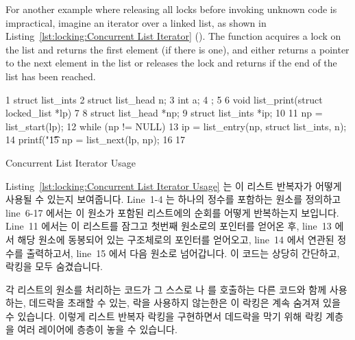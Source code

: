 For another example where releasing all locks before invoking unknown
code is impractical, imagine an iterator over a linked list, as shown in
Listing~\ref{lst:locking:Concurrent List Iterator} ().
The  function acquires a lock on the list and returns
the first element (if there is one), and
 either returns a pointer to the next element in the list
or releases the lock and returns  if the end of the list has
been reached.
\fi

\begin{listing}[tbp]
{ \scriptsize
\begin{verbbox}
  1 struct list_ints {
  2   struct list_head n;
  3   int a;
  4 };
  5 
  6 void list_print(struct locked_list *lp)
  7 {
  8   struct list_head *np;
  9   struct list_ints *ip;
 10 
 11   np = list_start(lp);
 12   while (np != NULL) {
 13     ip = list_entry(np, struct list_ints, n);
 14     printf("\t%
 15     np = list_next(lp, np);
 16   }
 17 }
\end{verbbox}
}
\centering
\theverbbox
\caption{Concurrent List Iterator Usage}
\label{lst:locking:Concurrent List Iterator Usage}
\end{listing}

Listing~\ref{lst:locking:Concurrent List Iterator Usage} 는 이 리스트 반복자가
어떻게 사용될 수 있는지 보여줍니다.
Line~1-4 는 하나의 정수를 포함하는  원소를 정의하고 line~6-17
에서는 이 원소가 포함된 리스트에의 순회를 어떻게 반복하는지 보입니다.
Line~11 에서는 이 리스트를 잠그고 첫번째 원소로의 포인터를 얻어온 후, line~13
에서 해당 원소에 동봉되어 있는  구조체로의 포인터를 얻어오고,
line~14 에서 연관된 정수를 출력하고서, line~15 에서 다음 원소로 넘어갑니다.
이 코드는 상당히 간단하고, 락킹을 모두 숨겼습니다.

각 리스트의 원소를 처리하는 코드가 그 스스로  나
 를 호출하는 다른 코드와 함께 사용하는, 데드락을 초래할 수
있는, 락을 사용하지 않는한은 이 락킹은 계속 숨겨져 있을 수 있습니다.
이렇게 리스트 반복자 락킹을 구현하면서 데드락을 막기 위해 락킹 계층을 여러
레이어에 층층이 놓을 수 있습니다.

